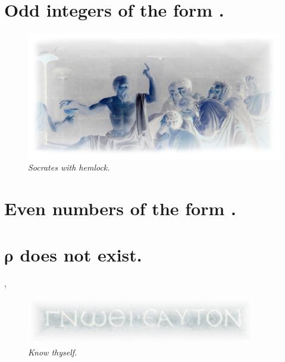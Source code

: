 \documentclass[preview]{standalone}
\begin{document}
\section{Odd integers of the form .}

\begin{figure}[h!]
    \centering
    \includegraphics[width=13.25cm]{../resources/jpg/1.6.introduction.to.proofs/socrates.jpg}
    \caption*{\emph{Socrates with hemlock.}}
\end{figure}


\section{Even numbers of the form .}

\pagebreak


\section{$\bm{\rho}$ does not exist.}

\sep
\begin{figure}[h!]
    \centering
    \includegraphics[width=10cm]{../resources/jpg/1.6.introduction.to.proofs/know_thyself.jpg}
    \caption*{\emph{Know thyself.}}
\end{figure} 
\pagebreak
\thispagestyle{empty}
\end{document}
